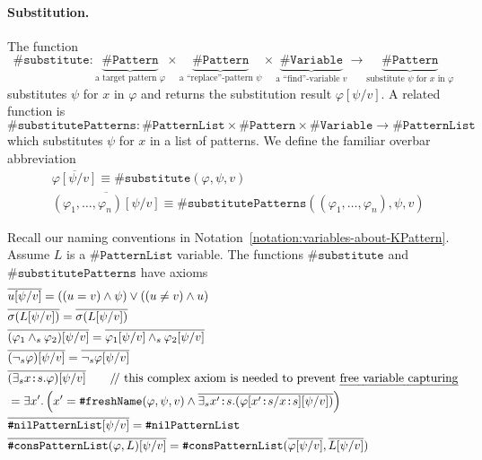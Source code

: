 \documentclass[UTF8,11pt]{article}
\theoremstyle{plain}
\theoremstyle{definition}
\theoremstyle{remark}
\newcommand{\cln}{\texttt{:}}
\newcommand{\doubleslash}{/\!/{ }}
\newcommand{\sharpsymbol}{\#}
\newcommand{\KPatternList}{\texttt{\sharpsymbol PatternList}}
\newcommand{\KnilKPatternList}{\texttt{\sharpsymbol nilPatternList}}
\newcommand{\KconsKPatternList}{\texttt{\sharpsymbol consPatternList}}
\newcommand{\KVariable}{\texttt{\sharpsymbol Variable}}
\newcommand{\KPattern}{\texttt{\sharpsymbol Pattern}}
\newcommand{\KfreshName}{\texttt{\sharpsymbol freshName}}
\newcommand{\Ksubstitute}{\texttt{\sharpsymbol substitute}}
\newcommand{\KsubstitutePatterns}{\texttt{\sharpsymbol substitutePatterns}}
\begin{document}
\paragraph{Substitution.}
The function
$$\Ksubstitute \colon \underbrace{\KPattern}_\text{a target pattern $\varphi$} 
\times \underbrace{\KPattern}_\text{a ``replace''-pattern $\psi$} \times 
\underbrace{\KVariable}_\text{a ``find''-variable $v$} \to 
\underbrace{\KPattern}_\text{substitute $\psi$ for $x$ in $\varphi$}$$
substitutes $\psi$ for $x$ in $\varphi$ and returns the substitution result 
$\varphi[\psi / v]$.
A related function is 
$$\KsubstitutePatterns \colon \KPatternList \times \KPattern \times \KVariable 
\to \KPatternList$$
which substitutes $\psi$ for $x$ in a list of patterns.
We define the familiar overbar abbreviation 
\begin{align*}
& \overline{\varphi[\psi / v]} \equiv \Ksubstitute(\varphi, \psi, v) \\
& \overline{(\varphi_1,\dots,\varphi_n)[\psi / v]} \equiv 
\KsubstitutePatterns((\varphi_1,\dots,\varphi_n), \psi, v)
\end{align*}

Recall our naming conventions in 
Notation~\ref{notation:variables-about-KPattern}.
Assume $L$ is a $\KPatternList$ variable.
The functions $\Ksubstitute$ and $\KsubstitutePatterns$ have axioms
\begin{align*}
  & \overline{u [\psi / v]} 
  = ((u = v) \wedge \psi)
  \vee ((u \neq v) \wedge u)
  \\
  & \overline{\sigma(L [\psi / v])} = 
  \overline{\sigma(L[\psi / v])}
  \\
  & \overline{(\varphi_1 \wedge_{s} \varphi_2) [\psi / v]} = 
  \overline{\varphi_1[\psi / v] \wedge_{s} \varphi_2[\psi / v]}
  \\
  & \overline{(\neg_{s} \varphi)[\psi / v]} = \overline{\neg_{s} \varphi[\psi 
  / v]}
  \\
  & \overline{(\exists_s x \cln s . \varphi)[\psi/v]} 
  \qquad \text{\doubleslash this complex axiom is needed to 
  	prevent \emph{free variable capturing}}\\
  & = \exists x' . \left(x' = \KfreshName(\varphi, \psi, 
  v) \wedge \overline{\exists_s x' \cln s . 
  (\varphi[x' \cln s / x \cln s][\psi/v])}\right)
  \\
  & \overline{\KnilKPatternList[\psi / v]} = \KnilKPatternList
  \\
  & \overline{\KconsKPatternList(\varphi, L)[\psi / v]} = 
  \KconsKPatternList(\overline{\varphi[\psi / v]}, \overline{L[\psi / v]})
\end{align*}
\end{document}
